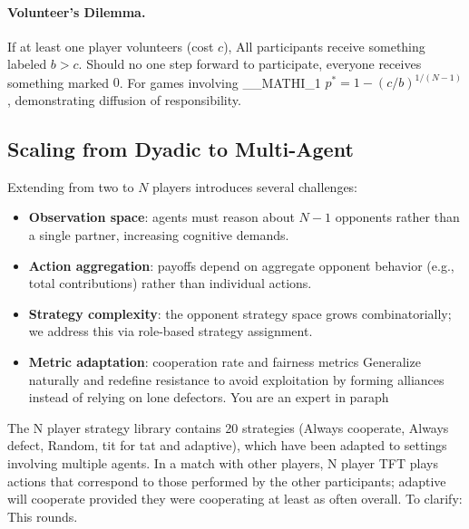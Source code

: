 \paragraph{Volunteer's Dilemma.} If at least one player volunteers (cost $c$),
All participants receive something labeled $b > c$. Should no one step forward to participate, everyone receives something marked $0$. For games involving __MATHI_1
$p^* = 1 - (c/b)^{1/(N-1)}$, demonstrating diffusion of responsibility.

\subsection{Scaling from Dyadic to Multi-Agent}
\label{sec:scaling}

Extending from two to $N$ players introduces several challenges:

\begin{itemize}[nosep]
    \item \textbf{Observation space}: agents must reason about $N-1$ opponents
          rather than a single partner, increasing cognitive demands.
    \item \textbf{Action aggregation}: payoffs depend on aggregate opponent
          behavior (e.g., total contributions) rather than individual actions.
    \item \textbf{Strategy complexity}: the opponent strategy space grows
          combinatorially; we address this via role-based strategy assignment.
    \item \textbf{Metric adaptation}: cooperation rate and fairness metrics
Generalize naturally and redefine resistance to avoid exploitation by forming alliances instead of relying on lone defectors. You are an expert in paraph
\end{itemize}

The N player strategy library contains 20 strategies (Always cooperate, Always defect, Random, tit for tat and adaptive), which have been adapted to settings involving multiple agents. In a match with other players, N player TFT plays actions that correspond to those performed by the other participants; adaptive will cooperate provided they were cooperating at least as often overall. To clarify: This
rounds.
